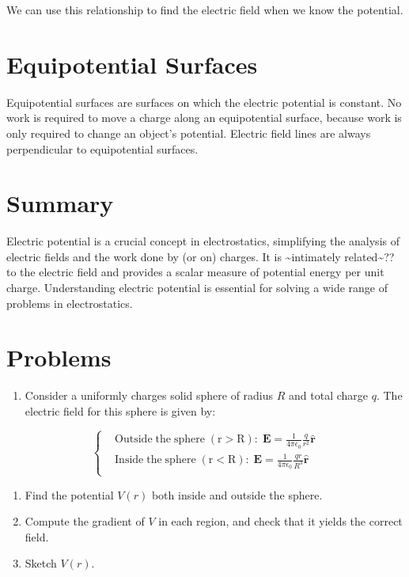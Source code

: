 \documentclass[
  letterpaper,
  DIV=11,
  numbers=noendperiod]{scrreprt}
\providecommand{\tightlist}{%
  \setlength{\itemsep}{0pt}\setlength{\parskip}{0pt}}\usepackage{longtable,booktabs,array}
\begin{document}
We can use this relationship to find the electric field when we know the
potential.

\section{Equipotential Surfaces}\label{equipotential-surfaces}

Equipotential surfaces are surfaces on which the electric potential is
constant. No work is required to move a charge along an equipotential
surface, because work is only required to change an object's potential.
Electric field lines are always perpendicular to equipotential surfaces.

\section{Summary}\label{summary-1}

Electric potential is a crucial concept in electrostatics, simplifying
the analysis of electric fields and the work done by (or on) charges. It
is \textasciitilde intimately related\textasciitilde?? to the electric
field and provides a scalar measure of potential energy per unit charge.
Understanding electric potential is essential for solving a wide range
of problems in electrostatics.

\section{Problems}\label{problems-1}

\begin{enumerate}
\def\labelenumi{\arabic{enumi})}
\tightlist
\item
  Consider a uniformly charges solid sphere of radius \(R\) and total
  charge \(q\). The electric field for this sphere is given by:
\end{enumerate}

\[
\left\{
    \begin{aligned}
         & \mathrm{Outside \; the \; sphere \; (r > R):} \; \mathrm{\mathbf{E}}= \frac{1}{4\pi\epsilon_0} \frac{q}{r^2} \hat{\mathrm{\mathbf{r}}}  \\
         & \mathrm{Inside \; the \; sphere \; (r < R):} \; \mathrm{\mathbf{E}}= \frac{1}{4\pi\epsilon_0} \frac{qr}{R^3} \hat{\mathrm{\mathbf{r}}} \\
    \end{aligned}
\right.
\]

\begin{enumerate}
\def\labelenumi{(\alph{enumi})}
\tightlist
\item
  Find the potential \(V(r)\) both inside and outside the sphere.
\item
  Compute the gradient of \(V\) in each region, and check that it yields
  the correct field.
\item
  Sketch \(V(r)\).
\end{enumerate}
\end{document}
